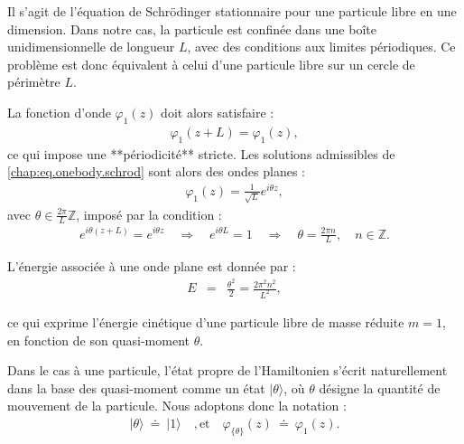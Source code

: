 




Il s'agit de l’équation de Schrödinger stationnaire pour une particule libre en une dimension. Dans notre cas, la particule est confinée dans une boîte unidimensionnelle de longueur $L$, avec des conditions aux limites périodiques. Ce problème est donc équivalent à celui d’une particule libre sur un cercle de périmètre $L$.

La fonction d’onde $\varphi_1(z)$ doit alors satisfaire :
\begin{eqnarray}
	\varphi_1(z+L) = \varphi_1(z),
\end{eqnarray}
ce qui impose une **périodicité** stricte. Les solutions admissibles de \eqref{chap:eq.onebody.schrod} sont alors des ondes planes :
\begin{eqnarray}
	\varphi_1(z) = \frac{1}{\sqrt{L}} e^{i \theta z},
\end{eqnarray}
avec $\theta \in \frac{2\pi}{L} \mathbb{Z}$, imposé par la condition :
\begin{eqnarray}
	e^{i \theta(z+L)} = e^{i \theta z} \quad \Rightarrow \quad e^{i \theta L} = 1 \quad \Rightarrow \quad \theta = \frac{2\pi n}{L}, \quad n \in \mathbb{Z}.
\end{eqnarray}

L’énergie associée à une onde plane est donnée par :
\begin{eqnarray}
	E & = & \frac{\theta^2}{2} = \frac{2\pi^2 n^2}{L^2},
\end{eqnarray}

ce qui exprime l’énergie cinétique d’une particule libre de masse réduite $m = 1$, en fonction de son quasi-moment $\theta$.

Dans le cas à une particule, l’état propre de l’Hamiltonien s’écrit naturellement dans la base des quasi-moment comme un état \(\vert \theta \rangle\), où \(\theta\) désigne la quantité de mouvement de la particule.  
Nous adoptons donc la notation :
\begin{eqnarray}
	\vert \theta \rangle ~ \doteq ~  \vert 1 \rangle \quad, \mbox{et} \quad  \varphi_{\{\theta\}}(z) ~ \doteq ~ \varphi_1(z).
\end{eqnarray}

